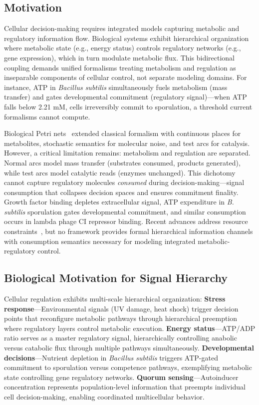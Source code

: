
\subsection{Motivation}

Cellular decision-making requires integrated models capturing metabolic and regulatory information flow. Biological systems exhibit hierarchical organization where metabolic state (e.g., energy status) controls regulatory networks (e.g., gene expression), which in turn modulate metabolic flux. This bidirectional coupling demands unified formalisms treating metabolism and regulation as inseparable components of cellular control, not separate modeling domains. For instance, ATP in \textit{Bacillus subtilis} simultaneously fuels metabolism (mass transfer) and gates developmental commitment (regulatory signal)---when ATP falls below 2.21 mM, cells irreversibly commit to sporulation, a threshold current formalisms cannot compute.

\noindent Biological Petri nets~\cite{reddy1993,heiner2008} extended classical formalism with continuous places for metabolites, stochastic semantics for molecular noise, and test arcs for catalysis. However, a critical limitation remains: metabolism and regulation are separated. Normal arcs model mass transfer (substrates consumed, products generated), while test arcs model catalytic reads (enzymes unchanged). This dichotomy cannot capture regulatory molecules \textit{consumed} during decision-making---signal consumption that collapses decision spaces and ensures commitment finality. Growth factor binding depletes extracellular signal, ATP expenditure in \textit{B. subtilis} sporulation gates developmental commitment, and similar consumption occurs in lambda phage CI repressor binding. Recent advances address resource constraints~\cite{genovese2021}, but no framework provides formal hierarchical information channels with consumption semantics necessary for modeling integrated metabolic-regulatory control.

\subsection{Biological Motivation for Signal Hierarchy}

Cellular regulation exhibits multi-scale hierarchical organization: \textbf{Stress response}---Environmental signals (UV damage, heat shock) trigger decision points that reconfigure metabolic pathways through hierarchical preemption where regulatory layers control metabolic execution. \textbf{Energy status}---ATP/ADP ratio serves as a master regulatory signal, hierarchically controlling anabolic versus catabolic flux through multiple pathways simultaneously. \textbf{Developmental decisions}---Nutrient depletion in \textit{Bacillus subtilis} triggers ATP-gated commitment to sporulation versus competence pathways, exemplifying metabolic state controlling gene regulatory networks. \textbf{Quorum sensing}---Autoinducer concentration represents population-level information that preempts individual cell decision-making, enabling coordinated multicellular behavior.

